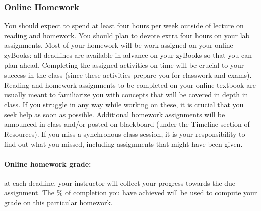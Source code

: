 \documentclass[12pt]{scrartcl}
\begin{document}
\subsubsection{Online Homework} 
You should expect to spend at least four hours per week outside of lecture on reading and homework. You should plan to devote extra four hours on your lab assignments. 
Most of your homework will be work assigned on your online zyBooks: 
all deadlines are available in advance on your zyBooks so that you can plan ahead. 
Completing the assigned activities on time will be crucial to your success in the class (since these activities prepare you for classwork and exams). 
Reading and homework assignments to be completed on your online textbook are usually meant to familiarize you with concepts that will be covered in depth in class. 
If you struggle in any way while working on these, it is crucial that you seek help as soon as possible.
Additional homework assignments will be announced in class and/or posted on blackboard (under the Timeline section of Resources).
If you miss a synchronous class session, it is your responsibility to find out what you missed, including assignments that might have been given.


\paragraph{Online homework grade:} at each deadline, your instructor will collect your progress towards the due assignment. 
The \% of completion you have achieved will be used to compute your grade on this particular homework. 
\end{document}
